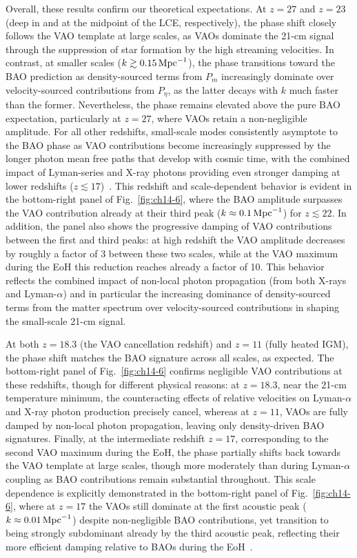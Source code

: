 Overall, these results confirm our theoretical expectations. At $z=27$ and $z=23$ (deep in and at the midpoint of the LCE, respectively), the phase shift closely follows the VAO template at large scales, as VAOs dominate the 21-cm signal through the suppression of star formation by the high streaming velocities. In contrast, at smaller scales ($k\gtrsim 0.15\,\rm{Mpc}^{-1}$), the phase transitions toward the BAO prediction as density-sourced terms from $P_m$ increasingly dominate over velocity-sourced contributions from $P_\eta$, as the latter decays with $k$ much faster than the former. Nevertheless, the phase remains elevated above the pure BAO expectation, particularly at $z=27$, where VAOs retain a non-negligible amplitude. For all other redshifts, small-scale modes consistently asymptote to the BAO phase as VAO contributions become increasingly suppressed by the longer photon mean free paths that develop with cosmic time, with the combined impact of Lyman-series and X-ray photons providing even stronger damping at lower redshifts ($z\lesssim 17$)~\cite{cruz24,cruz25}. This redshift and scale-dependent behavior is evident in the bottom-right panel of Fig.~\ref{fig:ch14-6}, where the BAO amplitude surpasses the VAO contribution already at their third peak ($k\approx 0.1\,\rm{Mpc}^{-1}$) for $z\lesssim 22$. In addition, the panel also shows the progressive damping of VAO contributions between the first and third peaks: at high redshift the VAO amplitude decreases by roughly a factor of 3 between these two scales, while at the VAO maximum during the EoH this reduction reaches already a factor of 10. This behavior reflects the combined impact of non-local photon propagation (from both X-rays and Lyman-$\alpha$) and in particular the increasing dominance of density-sourced terms from the matter spectrum over velocity-sourced contributions in shaping the small-scale 21-cm signal.

At both $z=18.3$ (the VAO cancellation redshift) and $z=11$ (fully heated IGM), the phase shift matches the BAO signature across all scales, as expected. The bottom-right panel of Fig.~\ref{fig:ch14-6} confirms negligible VAO contributions at these redshifts, though for different physical reasons: at $z=18.3$, near the 21-cm temperature minimum, the counteracting effects of relative velocities on Lyman-$\alpha$ and X-ray photon production precisely cancel, whereas at $z=11$, VAOs are fully damped by non-local photon propagation, leaving only density-driven BAO signatures. Finally, at the intermediate redshift $z=17$, corresponding to the second VAO maximum during the EoH, the phase partially shifts back towards the VAO template at large scales, though more moderately than during Lyman-$\alpha$ coupling as BAO contributions remain substantial  throughout. This scale dependence is explicitly demonstrated in the bottom-right panel of Fig.~\ref{fig:ch14-6}, where at $z=17$ the VAOs still dominate at the first acoustic peak ($k\approx 0.01\,\rm{Mpc}^{-1}$) despite non-negligible BAO contributions, yet transition to being strongly subdominant already by the third acoustic peak, reflecting their more efficient damping relative to BAOs during the EoH~\cite{cruz24,cruz25}.

